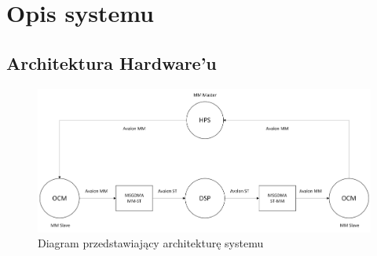 \chapter{Opis systemu}
\label{cha:opisSystemu}


\section{Architektura Hardware'u}
\label{sec:strukturaDokumentu}

\begin{figure}[!htb]
    \centerline{\includegraphics[scale=0.6]{hardwareSystemDiagram.png}}
    \caption{Diagram przedstawiający architekturę systemu}
    \label{fig:de0-nano-soc}
\end{figure}

